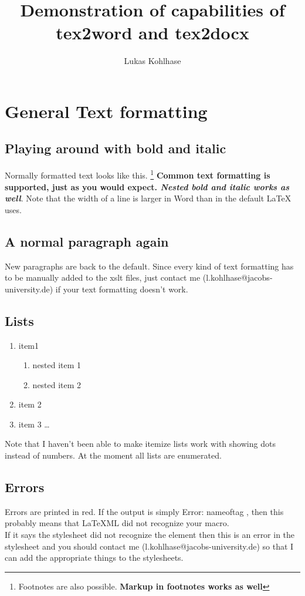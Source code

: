 \documentclass{article}
\author{Lukas Kohlhase}
\title{Demonstration of capabilities of tex2word and tex2docx}
\begin{document}
\maketitle
\tableofcontents
\section{General Text formatting}
\subsection{Playing around with bold and italic}
Normally formatted text looks like this. \footnote{Footnotes are also possible. \textbf{Markup in footnotes works as well}} \textbf{Common text formatting is supported, just as you would expect. \textit {Nested bold and italic works as well}}. Note that the width of a line is larger in Word than in the default LaTeX uses.  \\ 
\subsection{A normal paragraph again}
New paragraphs are back to the default. Since every kind of text formatting has to be manually added to the xslt files, just contact me (l.kohlhase@jacobs-university.de) if your text formatting doesn't work. 
\subsection{Lists}
\begin{enumerate}
\item item1
\begin{enumerate}
\item nested item 1
\item nested item 2
\end{enumerate}
\item item 2 
\item item 3 \ldots 
\end{enumerate}
Note that I haven't been able to make itemize lists work with showing dots instead of numbers. At the moment all lists are enumerated.
\subsection{Errors}
Errors are printed in red. If the output is simply Error: nameoftag , then this probably means that LaTeXML did not recognize your macro. \\ 
If it says the stylesheet did not recognize the element then this is an error in the stylesheet and you should contact me (l.kohlhase@jacobs-university.de) so that I can add the appropriate things to the stylesheets. 
\end{document}
